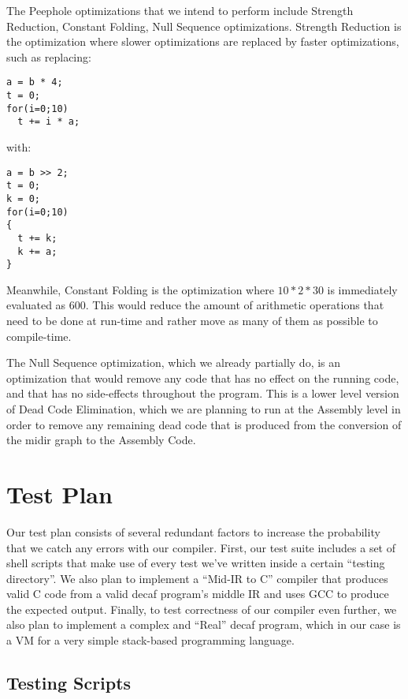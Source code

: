 \documentclass[11pt]{article}
\begin{document}
The Peephole optimizations that we intend to perform include Strength
Reduction, Constant Folding, Null Sequence optimizations. Strength
Reduction is the optimization where slower optimizations are replaced
by faster optimizations, such as replacing:\\

\begin{verbatim}
a = b * 4;
t = 0;
for(i=0;10)
  t += i * a;
\end{verbatim}

with:\\

\begin{verbatim}
a = b >> 2;
t = 0;
k = 0;
for(i=0;10)
{
  t += k;
  k += a;
}
\end{verbatim}

Meanwhile, Constant Folding is the optimization where $10*2*30$ is
immediately evaluated as $600$. This would reduce the amount of
arithmetic operations that need to be done at run-time and rather move
as many of them as possible to compile-time.

The Null Sequence optimization, which we already partially do, is an
optimization that would remove any code that has no effect on the
running code, and that has no side-effects throughout the
program. This is a lower level version of Dead Code Elimination, which
we are planning to run at the Assembly level in order to remove any
remaining dead code that is produced from the conversion of the midir
graph to the Assembly Code.

\section {Test Plan}
\label{sec:test}

Our test plan consists of several redundant factors to increase the
probability that we catch any errors with our compiler. First, our
test suite includes a set of shell scripts that make use of every test
we've written inside a certain ``testing directory''. We also plan to
implement a ``Mid-IR to C'' compiler that produces valid C code from a
valid decaf program's middle IR and uses GCC to produce the expected
output. Finally, to test correctness of our compiler even further, we
also plan to implement a complex and ``Real'' decaf program, which in
our case is a VM for a very simple stack-based programming language.

\subsection {Testing Scripts}
\end{document}
